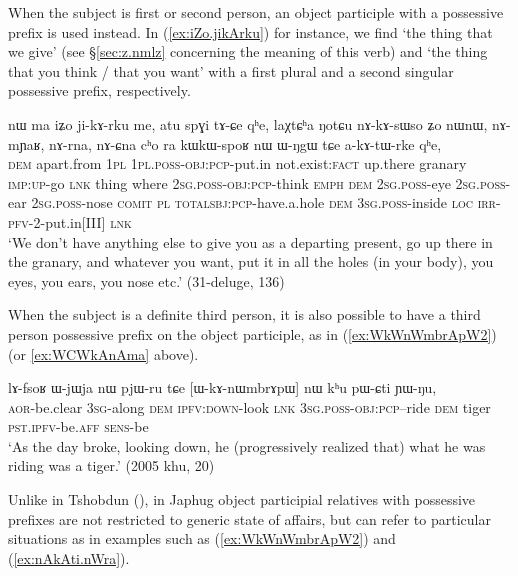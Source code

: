 When the subject is first or second person, an object participle with a possessive prefix  is used instead. In (\ref{ex:iZo.jikArku}) for instance, we find  `the thing that we give' (see §\ref{sec:z.nmlz} concerning the meaning of this verb) and  `the thing that you think / that you want' with a first plural and a second singular possessive prefix, respectively.

\begin{exe}
\ex \label{ex:iZo.jikArku}
\gll   nɯ ma iʑo ji-kɤ-rku me,  atu spɣi tɤ-ɕe qʰe, laχtɕʰa ŋotɕu nɤ-kɤ-sɯso ʑo nɯnɯ, 
nɤ-mɲaʁ, nɤ-rna, nɤ-ɕna cʰo ra kɯ\redp{}kɯ-spoʁ nɯ ɯ-ŋgɯ tɕe a-kɤ-tɯ-rke qʰe, \\
\textsc{dem} apart.from \textsc{1pl} \textsc{1pl}.\textsc{poss}-\textsc{obj}:\textsc{pcp}-put.in not.exist:\textsc{fact} up.there granary \textsc{imp}:\textsc{up}-go \textsc{lnk} thing where \textsc{2sg}.\textsc{poss}-\textsc{obj}:\textsc{pcp}-think \textsc{emph} \textsc{dem} \textsc{2sg}.\textsc{poss}-eye  \textsc{2sg}.\textsc{poss}-ear  \textsc{2sg}.\textsc{poss}-nose \textsc{comit} \textsc{pl}  \textsc{total}\redp{}\textsc{sbj}:\textsc{pcp}-have.a.hole \textsc{dem} \textsc{3sg}.\textsc{poss}-inside \textsc{loc} \textsc{irr}-\textsc{pfv}-2-put.in[III] \textsc{lnk} \\
\glt `We don't have anything else to give you as a departing present, go up there in the granary, and whatever you want, put it in all the holes (in your body), you eyes, you ears, you nose etc.' (31-deluge, 136)
\end{exe}  

When the subject is a definite third person, it is also possible to have a third person possessive prefix on the object participle, as in (\ref{ex:WkWnWmbrApW2}) (or \ref{ex:WCWkAnAma} above).

\begin{exe}
\ex \label{ex:WkWnWmbrApW2}
\gll  lɤ-fsoʁ ɯ-jɯja nɯ pjɯ-ru tɕe [ɯ-kɤ-nɯmbrɤpɯ] nɯ kʰu pɯ-ɕti ɲɯ-ŋu,  \\
\textsc{aor}-be.clear    \textsc{3sg}-along  \textsc{dem} \textsc{ipfv}:\textsc{down}-look \textsc{lnk} \textsc{3sg}.\textsc{poss}-\textsc{obj}:\textsc{pcp}--ride \textsc{dem} tiger \textsc{pst}.\textsc{ipfv}-be.\textsc{aff}  \textsc{sens}-be \\
\glt `As the day broke, looking down, he (progressively realized that) what he was riding was a tiger.' (2005 khu, 20)
\end{exe}

Unlike in Tshobdun (\citealt[10]{jacksonlin07}), in Japhug object participial relatives with possessive prefixes are not restricted to generic state of affairs, but can refer to particular situations as in examples such as (\ref{ex:WkWnWmbrApW2}) and (\ref{ex:nAkAti.nWra}).

